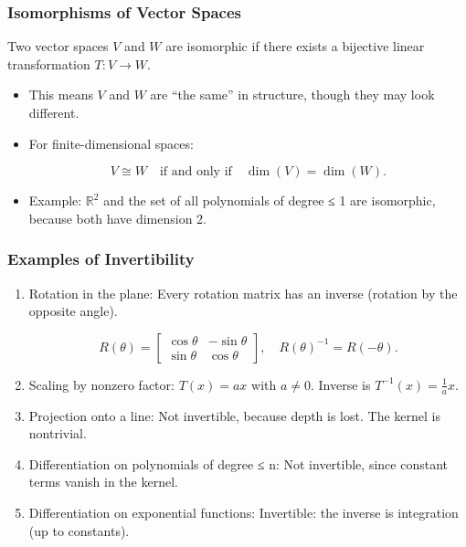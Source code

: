 \documentclass[
  letterpaper,
  DIV=11,
  numbers=noendperiod]{scrreprt}
\begin{document}
\subsubsection{Isomorphisms of Vector
Spaces}\label{isomorphisms-of-vector-spaces}

Two vector spaces \(V\) and \(W\) are isomorphic if there exists a
bijective linear transformation \(T: V \to W\).

\begin{itemize}
\item
  This means \(V\) and \(W\) are ``the same'' in structure, though they
  may look different.
\item
  For finite-dimensional spaces:

  \[
  V \cong W \quad \text{if and only if} \quad \dim(V) = \dim(W).
  \]
\item
  Example: \(\mathbb{R}^2\) and the set of all polynomials of degree ≤ 1
  are isomorphic, because both have dimension 2.
\end{itemize}

\subsubsection{Examples of
Invertibility}\label{examples-of-invertibility}

\begin{enumerate}
\def\labelenumi{\arabic{enumi}.}
\item
  Rotation in the plane: Every rotation matrix has an inverse (rotation
  by the opposite angle).

  \[
  R(\theta) = \begin{bmatrix} \cos\theta & -\sin\theta \\ \sin\theta & \cos\theta \end{bmatrix}, \quad R(\theta)^{-1} = R(-\theta).
  \]
\item
  Scaling by nonzero factor: \(T(x) = ax\) with \(a \neq 0\). Inverse is
  \(T^{-1}(x) = \tfrac{1}{a}x\).
\item
  Projection onto a line: Not invertible, because depth is lost. The
  kernel is nontrivial.
\item
  Differentiation on polynomials of degree ≤ n: Not invertible, since
  constant terms vanish in the kernel.
\item
  Differentiation on exponential functions: Invertible: the inverse is
  integration (up to constants).
\end{enumerate}
\end{document}
